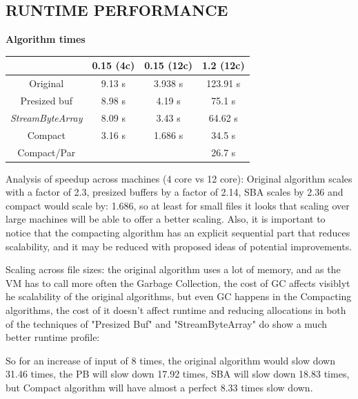 \documentclass[a4paper,twoside]{article}
\begin{document}
\subsection{\uppercase{Runtime performance}}\label{subsec:uppercase9}
\begin{small}
\par
\textbf{Algorithm times} \\
\vspace{-0.4cm}
\begin{center}
\begin{tabular}{|c|c|c|c|}
\hline
						& 0.15 (4c)		    & 0.15 (12c)		& 1.2 (12c) 			\\ \hline
Original				& 9.13 s			& 3.938 s			& 123.91 s			\\ \hline
Presized buf   			& 8.98 s			& 4.19 s			& 75.1 s	\\ \hline
{\textit{StreamByteArray} }	& 8.09 s			& 3.43 s			& 64.62 s			\\ \hline
Compact 				& 3.16 s			& 1.686 s			& 34.5 s	\\ \hline
Compact/Par 			& 			        & 					& 26.7 s	\\ \hline
\end{tabular}
\end{center}
\end{small}

Analysis of speedup across machines (4 core vs 12 core):
Original algorithm scales with a factor of 2.3, presized buffers by a factor of 2.14, SBA scales by 2.36
and compact would scale by: 1.686, so at least for small files it looks that scaling over large machines will be able to offer a better scaling.
Also, it is important to notice that the compacting algorithm has an explicit sequential part that reduces scalability, and it may be reduced with proposed ideas
of potential improvements.

Scaling across file sizes: the original algorithm uses a lot of memory, and as the VM has to call more often the Garbage Collection, the cost of GC affects visiblyt he scalability of the original algorithms, but even GC happens in the Compacting algorithms, the cost of it doesn't affect runtime and reducing allocations in both of the techniques of "Presized Buf" and "StreamByteArray" do show a much better runtime profile:

So for an increase of input of 8 times, the original algorithm would slow down 31.46 times, the PB will slow down 17.92 times, SBA will slow down 18.83 times, but Compact algorithm will have almost a perfect 8.33 times slow down.
\end{document}
